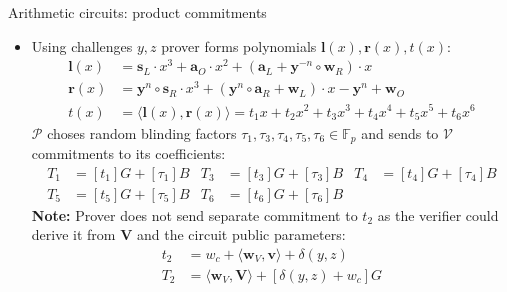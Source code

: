 \documentclass{zkdl-presentation-template}
\begin{document}
\begin{frame}{Arithmetic circuits: product commitments}
    \begin{itemize}
        \item Using challenges $y,z$ prover forms polynomials $\mathbf{l}(x), \mathbf{r}(x), t(x)$:
        \begin{equation*}
            \begin{aligned}
                \mathbf{l}(x) &= \mathbf{s}_L \cdot x^3 + \mathbf{a}_O \cdot x^2 + (\mathbf{a}_L + \mathbf{y}^{-n} \circ \mathbf{w}_R) \cdot x \\
                \mathbf{r}(x) &= \mathbf{y}^n \circ \mathbf{s}_R \cdot x^3 + (\mathbf{y}^n \circ \mathbf{a}_R +  \mathbf{w}_L) \cdot x - \mathbf{y}^n + \mathbf{w}_O \\
                t(x) &= \langle \mathbf{l}(x), \mathbf{r}(x) \rangle = t_1 x + t_2 x^2 + t_3 x^3 + t_4 x^4 + t_5 x^5 + t_6 x^6
            \end{aligned}
        \end{equation*}
        $\mathcal{P}$ choses random blinding factors $\tau_1, \tau_3, \tau_4, \tau_5, \tau_6 \in \mathbb{F}_p$ and sends to $\mathcal{V}$ commitments to its coefficients:
        \begin{equation*}
            \begin{aligned}
                T_1 &= [t_1]G + [\tau_1]B &
                T_3 &= [t_3]G + [\tau_3]B &
                T_4 &= [t_4]G + [\tau_4]B\\
                T_5 &= [t_5]G + [\tau_5]B &
                T_6 &= [t_6]G + [\tau_6]B &
            \end{aligned}
        \end{equation*}
        \textbf{Note:} Prover does not send separate commitment to $t_2$ as the verifier could derive it from $\mathbf{V}$ and the circuit public parameters: 
        \begin{align*}
            t_2 &= w_c + \langle \mathbf{w}_V, \mathbf{v} \rangle + \delta(y, z) \\
            T_2 &= \langle \mathbf{w}_V, \mathbf{V} \rangle + [\delta(y, z) + w_c]G
        \end{align*}
    \end{itemize}
\end{frame}
\end{document}
